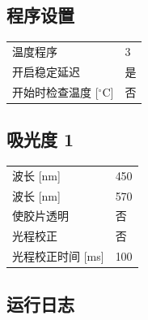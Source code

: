 \documentclass[UTF8,10pt,a4paper,fontset=fandol]{ctexart}
\newcommand{\fieldvalue}[1]{#1}
\begin{document}
\subsection*{程序设置}

\begin{tabular}{@{}ll@{}}
温度程序 &
\fieldvalue{3} \\
开启稳定延迟 &
\fieldvalue{是} \\
开始时检查温度 [$^\circ$C] &
\fieldvalue{否}
\end{tabular}

\subsection*{吸光度 1}

\begin{tabular}{@{}ll@{}}
波长 [nm] &
\fieldvalue{450} \\
波长 [nm] &
\fieldvalue{570} \\
使胶片透明 &
\fieldvalue{否} \\
光程校正 &
\fieldvalue{否} \\
光程校正时间 [ms] &
\fieldvalue{100}
\end{tabular}

\subsection*{运行日志}
\end{document}
